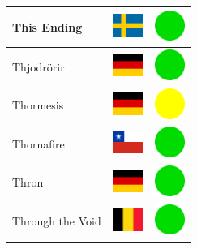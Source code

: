 \documentclass[12pt, a4paper, twoside]{report}
\begin{document}
\begin{center}
\begin{longtable}{|p{5cm}|p{2cm}|p{2cm}|}
 This Ending                                                & \includegraphics[width=1cm]{../img/flags/se} &   \includegraphics[width=1cm]{../likes/y} \\ \hline
 Thjodrörir                                                 & \includegraphics[width=1cm]{../img/flags/de} &   \includegraphics[width=1cm]{../likes/y} \\ \hline
 Thormesis                                                  & \includegraphics[width=1cm]{../img/flags/de} &   \includegraphics[width=1cm]{../likes/m} \\ \hline
 Thornafire                                                 & \includegraphics[width=1cm]{../img/flags/cl} &   \includegraphics[width=1cm]{../likes/y} \\ \hline
 Thron                                                      & \includegraphics[width=1cm]{../img/flags/de} &   \includegraphics[width=1cm]{../likes/y} \\ \hline
 Through the Void                                           & \includegraphics[width=1cm]{../img/flags/be} &   \includegraphics[width=1cm]{../likes/y} \\ \hline

\end{longtable}
\end{center}
\end{document}
